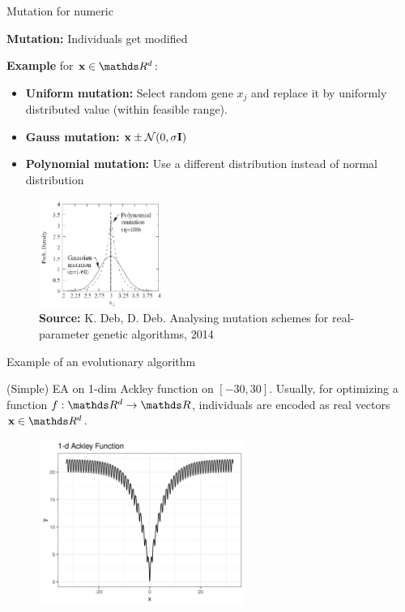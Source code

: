 \documentclass[11pt,compress,t,notes=noshow, xcolor=table]{beamer}
\begin{document}
\begin{vbframe}{Mutation for numeric}
\footnotesize

\textbf{Mutation:} Individuals get modified

\medskip

\textbf{Example} for $\xv \in \R^d$:

\begin{itemize}
    \item \textbf{Uniform mutation:} Select random gene $x_j$ and replace it by uniformly distributed value (within feasible range).
    \item \textbf{Gauss mutation:} $\mathbf{x} \pm \mathcal{N}(0, \sigma \mathbf{I})$
    \item \textbf{Polynomial mutation:} Use a different distribution instead of normal distribution
\end{itemize}
\begin{center}

\begin{figure}
  \includegraphics[height = 3.5cm, width = 4cm]{figure_man/polynomial_mutation.png}\\
  \scriptsize{\textbf{Source:} K. Deb, D. Deb. Analysing mutation schemes for real-parameter genetic algorithms, 2014}
\end{figure}
\end{center}

\end{vbframe}

\begin{vbframe}{Example of an evolutionary algorithm}
\small

(Simple) EA on 1-dim Ackley function on $[-30, 30]$.
Usually, for optimizing a function $f : \R^d \to \R$, individuals are encoded as real vectors $\xv \in \R^d$.

\medskip

\begin{center}
\begin{figure}
  \includegraphics[width=0.6\textwidth]{figure_man/1dim-ackley-func.png}
\end{figure}
\end{center}

\end{vbframe}
\end{document}
